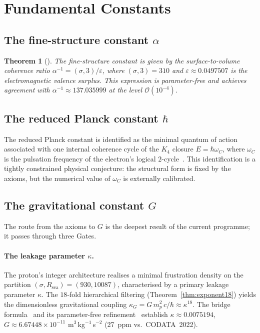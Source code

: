 \documentclass[11pt,a4paper]{article}
\theoremstyle{plain}
\newtheorem{theorem}{Theorem}[section]
\theoremstyle{definition}
\theoremstyle{remark}
\begin{document}
\section{Fundamental Constants}
\label{sec:constants}

\subsection{The fine-structure constant \texorpdfstring{$\alpha$}{alpha}}
\label{subsec:alpha}
\begin{theorem}[\cite{D12,D25}]
\label{thm:alpha}
The fine-structure constant is given by the surface-to-volume coherence ratio $\alpha^{-1}=(\sigma,3)/\varepsilon$, where $(\sigma,3)=310$ and $\varepsilon\approx 0.0497507$ is the electromagnetic valence surplus. This expression is parameter-free and achieves agreement with $\alpha^{-1}\approx 137.035999$ at the level $\mathcal{O}(10^{-4})$.
\end{theorem}

\subsection{The reduced Planck constant \texorpdfstring{$\hbar$}{hbar}}
\label{subsec:hbar}
The reduced Planck constant is identified as the minimal quantum of action associated with one internal coherence cycle of the $K_4$ closure $E=\hbar\omega_C$, where $\omega_C$ is the pulsation frequency of the electron's logical $2$-cycle~\cite{D01,D02}. This identification is a \textcolor{conjecturegreen}{tightly constrained physical conjecture}: the structural form is fixed by the axioms, but the numerical value of $\omega_C$ is externally calibrated.

\subsection{The gravitational constant \texorpdfstring{$G$}{G}}
\label{subsec:G}
The route from the axioms to $G$ is the deepest result of the current programme; it passes through three Gates.

\paragraph{The leakage parameter $\kappa$.} The proton's integer architecture realises a minimal frustration density on the partition $(\sigma, R_{\mathrm{sea}})=(930, 10087)$, characterised by a primary leakage parameter $\kappa$. The $18$-fold hierarchical filtering (Theorem~\ref{thm:exponent18}) yields the dimensionless gravitational coupling $\kappa_G=G\,m_p^2\,c/\hbar\approx\kappa^{18}$. The bridge formula~\cite{D21,V3D21} and its parameter-free refinement~\cite{D25,D25} establish $\kappa\approx 0.0075194$, $G\approx 6.67448\times10^{-11}$ m$^3$\,kg$^{-1}$\,s$^{-2}$ (27~ppm vs.\ CODATA~2022).
\end{document}
